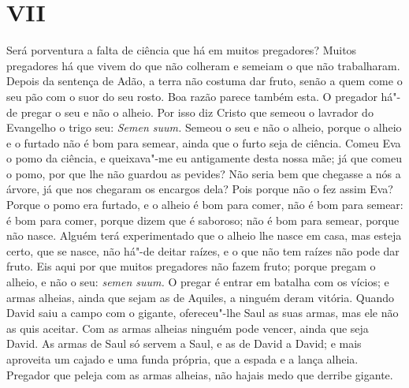 \section*{VII}

Será porventura a falta de ciência que há em muitos pregadores? Muitos
pregadores há que vivem do que não colheram e semeiam o que não
trabalharam. Depois da sentença de Adão, a terra não costuma dar fruto,
senão a quem come o seu pão com o suor do seu rosto. Boa razão parece
também esta. O pregador há"-de pregar o seu e não o alheio. Por isso diz
Cristo que semeou o lavrador do Evangelho o trigo seu: \emph{Semen
suum.} Semeou o seu e não o alheio, porque o alheio e o furtado não é
bom para semear, ainda que o furto seja de ciência. Comeu Eva o pomo da
ciência, e queixava"-me eu antigamente desta nossa mãe; já que comeu o
pomo, por que lhe não guardou as pevides? Não seria bem que chegasse a
nós a árvore, já que nos chegaram os encargos dela? Pois porque não o
fez assim Eva? Porque o pomo era furtado, e o alheio é bom para
comer, não é bom para semear: é bom para comer, porque dizem que é
saboroso; não é bom para semear, porque não nasce. Alguém terá
experimentado que o alheio lhe nasce em casa, mas esteja certo, que se
nasce, não há"-de deitar raízes, e o que não tem raízes não pode dar
fruto. Eis aqui por que muitos pregadores não fazem fruto; porque pregam
o alheio, e não o seu: \emph{semen suum.} O pregar é entrar em batalha
com os vícios; e armas alheias, ainda que sejam as de Aquiles, a ninguém
deram vitória. Quando David saiu a campo com o gigante, ofereceu"-lhe
Saul as suas armas, mas ele não as quis aceitar. Com as armas alheias ninguém
pode vencer, ainda que seja David. As armas de Saul só servem a Saul, e
as de David a David; e mais aproveita um cajado e uma funda própria, que
a espada e a lança alheia. Pregador que peleja com as armas alheias, não
hajais medo que derribe gigante.

